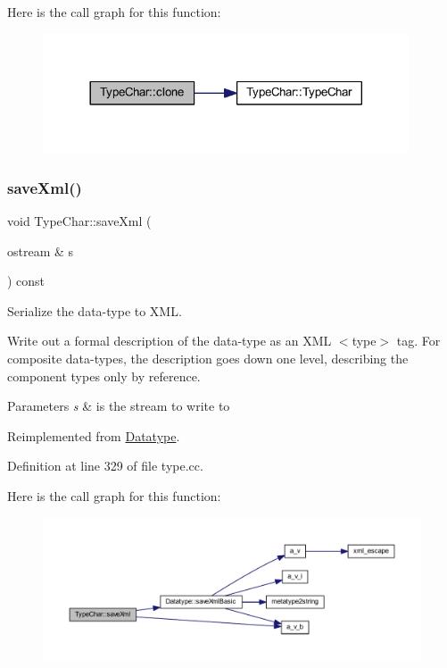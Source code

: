 Here is the call graph for this function\+:
\nopagebreak
\begin{figure}[H]
\begin{center}
\leavevmode
\includegraphics[width=308pt]{class_type_char_af09a0ae04e18990511b4f3bda2141559_cgraph}
\end{center}
\end{figure}
\mbox{\label{class_type_char_a29dadba593626c5de123934a5dcbe894}} 
\subsubsection{\texorpdfstring{saveXml()}{saveXml()}}
{\footnotesize\ttfamily void Type\+Char\+::save\+Xml (\begin{DoxyParamCaption}\item[{ostream \&}]{s }\end{DoxyParamCaption}) const\hspace{0.3cm}{\ttfamily [virtual]}}



Serialize the data-\/type to X\+ML. 

Write out a formal description of the data-\/type as an X\+ML $<$type$>$ tag. For composite data-\/types, the description goes down one level, describing the component types only by reference. 
\begin{DoxyParams}{Parameters}
{\em s} & is the stream to write to \\
\hline
\end{DoxyParams}


Reimplemented from \mbox{\hyperlink{class_datatype_a33339824f1c50d4354952296070c3902}{Datatype}}.



Definition at line 329 of file type.\+cc.

Here is the call graph for this function\+:
\nopagebreak
\begin{figure}[H]
\begin{center}
\leavevmode
\includegraphics[width=350pt]{class_type_char_a29dadba593626c5de123934a5dcbe894_cgraph}
\end{center}
\end{figure}


